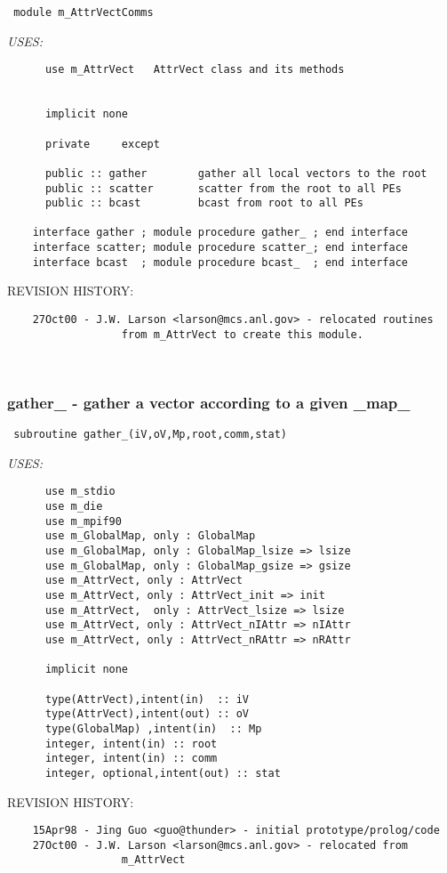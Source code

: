 \begin{verbatim} module m_AttrVectComms\end{verbatim}{\em USES:}
\begin{verbatim}      use m_AttrVect   AttrVect class and its methods
 
 
      implicit none
 
      private	  except
 
      public :: gather		  gather all local vectors to the root
      public :: scatter		  scatter from the root to all PEs
      public :: bcast		  bcast from root to all PEs
 
    interface gather ; module procedure gather_ ; end interface
    interface scatter; module procedure scatter_; end interface
    interface bcast  ; module procedure bcast_  ; end interface
 \end{verbatim}{\sf REVISION HISTORY:}
\begin{verbatim}  	27Oct00 - J.W. Larson <larson@mcs.anl.gov> - relocated routines
                  from m_AttrVect to create this module.\end{verbatim}
 
 
\mbox{}\hrulefill\ 
 

 \subsubsection{gather\_ - gather a vector according to a given \_map\_}


 
 
\begin{verbatim} 
 subroutine gather_(iV,oV,Mp,root,comm,stat)\end{verbatim}{\em USES:}
\begin{verbatim}      use m_stdio
      use m_die
      use m_mpif90
      use m_GlobalMap, only : GlobalMap
      use m_GlobalMap, only : GlobalMap_lsize => lsize
      use m_GlobalMap, only : GlobalMap_gsize => gsize
      use m_AttrVect, only : AttrVect
      use m_AttrVect, only : AttrVect_init => init
      use m_AttrVect,  only : AttrVect_lsize => lsize
      use m_AttrVect, only : AttrVect_nIAttr => nIAttr
      use m_AttrVect, only : AttrVect_nRAttr => nRAttr
 
      implicit none
 
      type(AttrVect),intent(in)  :: iV
      type(AttrVect),intent(out) :: oV
      type(GlobalMap) ,intent(in)  :: Mp
      integer, intent(in) :: root
      integer, intent(in) :: comm
      integer, optional,intent(out) :: stat
 \end{verbatim}{\sf REVISION HISTORY:}
\begin{verbatim}  	15Apr98 - Jing Guo <guo@thunder> - initial prototype/prolog/code
  	27Oct00 - J.W. Larson <larson@mcs.anl.gov> - relocated from
                  m_AttrVect\end{verbatim}
 
